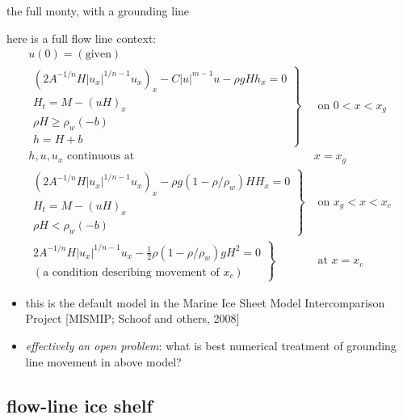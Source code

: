 \begin{frame}{the full monty, with a grounding line}
\label{slide:streamtoshelf}

\small
here is a full flow line context:
\begin{align*}
  u(0) = (\text{given}) \\
  \left.\begin{array}{r}
  \boxed{\left(2 A^{-1/n} H |u_x|^{1/n - 1} u_x\right)_x - C|u|^{m-1}u - \rho g H h_x = 0} \\
  H_t = M - (uH)_x \\
  \rho H \ge \rho_w (-b) \\
  h = H + b
  \end{array}\right\}& \text{ on } 0 < x < x_g \\
  h,u,u_x \text{ continuous at }& x=x_g \\
  \left.\begin{array}{r}
  \boxed{\left(2 A^{-1/n} H |u_x|^{1/n - 1} u_x\right)_x - \rho g (1-\rho/\rho_w) H H_x = 0} \\
  H_t = M - (uH)_x \\
  \rho H < \rho_w (-b)
  \end{array}\right\}& \text{ on } x_g < x < x_c \\
  \left.\begin{array}{r}
  2 A^{-1/n} H |u_x|^{1/n - 1} u_x - \frac{1}{2}\rho (1-\rho/\rho_w) g H^2 = 0 \\
  (\text{a condition describing movement of } x_c)
  \end{array}\right\}& \text{ at } x = x_c
\end{align*}
\small
\begin{itemize}
\item this is the default model in the Marine Ice Sheet Model Intercomparison Project [MISMIP; Schoof and others, 2008]\nocite{MISMIPwebpage}
\item \emph{effectively an open problem}:  what is best numerical treatment of grounding line movement in above model?
\end{itemize}
\end{frame}


\subsection{flow-line ice shelf}

